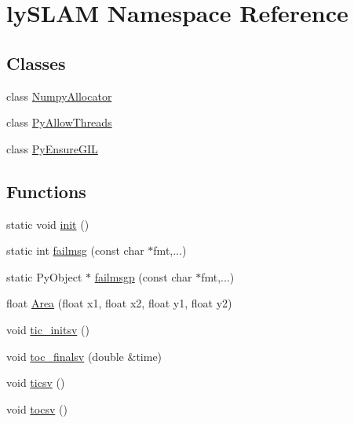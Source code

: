 \hypertarget{namespacelySLAM}{}\section{ly\+S\+L\+AM Namespace Reference}
\label{namespacelySLAM}
\subsection*{Classes}
\begin{DoxyCompactItemize}
\item 
class \hyperlink{classlySLAM_1_1NumpyAllocator}{Numpy\+Allocator}
\item 
class \hyperlink{classlySLAM_1_1PyAllowThreads}{Py\+Allow\+Threads}
\item 
class \hyperlink{classlySLAM_1_1PyEnsureGIL}{Py\+Ensure\+G\+IL}
\end{DoxyCompactItemize}
\subsection*{Functions}
\begin{DoxyCompactItemize}
\item 
static void \hyperlink{namespacelySLAM_a00b314520d011d12b2bd631293ea02a8}{init} ()
\item 
static int \hyperlink{namespacelySLAM_a7b41c0e11cbb97ca1485abd44d51e799}{failmsg} (const char $\ast$fmt,...)
\item 
static Py\+Object $\ast$ \hyperlink{namespacelySLAM_a4c4e113b266fb98524f7c06154fe33e1}{failmsgp} (const char $\ast$fmt,...)
\item 
float \hyperlink{namespacelySLAM_a432cf91e1b1dee06c5d9a35cc1b5529a}{Area} (float x1, float x2, float y1, float y2)
\item 
void \hyperlink{namespacelySLAM_a83245374bbce9e47c4878b5613fb98db}{tic\+\_\+initsv} ()
\item 
void \hyperlink{namespacelySLAM_adb77bc91beb203170ca5a301968f9f76}{toc\+\_\+finalsv} (double \&time)
\item 
void \hyperlink{namespacelySLAM_af18d8f81de160c1de261c5465c29523e}{ticsv} ()
\item 
void \hyperlink{namespacelySLAM_a56e5af1fe2c6086f5597b0e44465ffc3}{tocsv} ()
\end{DoxyCompactItemize}
